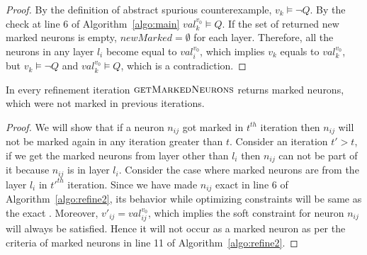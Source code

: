 \begin{proof}
By the definition of abstract spurious counterexample, ${v_k} \models \lnot Q$. 
By the check at line 6 of Algorithm~\ref{algo:main} ${val_k^{{v_0}}} \models Q$. 
If the set of returned new marked neurons is empty, $newMarked = \emptyset$ for each layer. 
Therefore, all the neurons in any layer $l_i$ become equal to ${val_i^{{v_0}}}$,  
which implies ${v_k}$ equals to ${val_k^{{v_0}}}$, but ${v_k} \models \lnot Q$ and 
${val_k^{{v_0}}} \models Q$, which is a contradiction.   
\end{proof}


\begin{theorem}
  \label{th:progress2}
  In every refinement iteration $\textsc{getMarkedNeurons}$
  returns marked neurons, which were not marked in previous iterations. 
\end{theorem}

\begin{proof}
We will show that if a neuron $n_{ij}$ got marked in $t^{th}$ iteration then $n_{ij}$ will not be marked again in any iteration greater than $t$.
Consider an iteration $t' > t$, if we get the marked neurons from layer other
than $l_i$ then $n_{ij}$ can not be part of it because $n_{ij}$ is in layer $l_i$. 
Consider the case where marked neurons are from the layer $l_i$ in $t'^{th}$ iteration. 
Since we have made $n_{ij}$ exact in line 6 of Algorithm~\ref{algo:refine2},
its behavior while optimizing constraints will be same as the exact \relu{}. 
Moreover, $v'_{ij} = val_{ij}^{v_0}$, 
which implies the soft constraint for neuron $n_{ij}$ will always be satisfied. Hence it will not occur as a marked neuron as per the criteria of marked neurons in line 11 of Algorithm~\ref{algo:refine2}.   
\end{proof}



